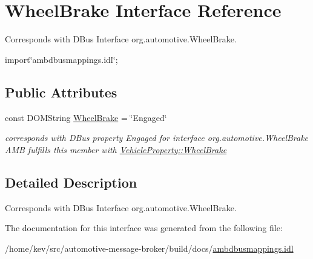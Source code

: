 \hypertarget{interfaceWheelBrake}{\section{Wheel\+Brake Interface Reference}
\label{interfaceWheelBrake}
}


Corresponds with D\+Bus Interface org.\+automotive.\+Wheel\+Brake.  




{\ttfamily import\char`\"{}ambdbusmappings.\+idl\char`\"{};}

\subsection*{Public Attributes}
\begin{DoxyCompactItemize}
\item 
\hypertarget{interfaceWheelBrake_aefe3f165494d64a9d241d239765c117b}{const D\+O\+M\+String \hyperlink{interfaceWheelBrake_aefe3f165494d64a9d241d239765c117b}{Wheel\+Brake} = \char`\"{}Engaged\char`\"{}}\label{interfaceWheelBrake_aefe3f165494d64a9d241d239765c117b}

\begin{DoxyCompactList}\small\item\em corresponds with D\+Bus property Engaged for interface org.\+automotive.\+Wheel\+Brake A\+M\+B fulfills this member with \hyperlink{classVehicleProperty_ad4f1ec038bee5ef30fbf8308aaba2794}{Vehicle\+Property\+::\+Wheel\+Brake} \end{DoxyCompactList}\end{DoxyCompactItemize}


\subsection{Detailed Description}
Corresponds with D\+Bus Interface org.\+automotive.\+Wheel\+Brake. 

The documentation for this interface was generated from the following file\+:\begin{DoxyCompactItemize}
\item 
/home/kev/src/automotive-\/message-\/broker/build/docs/\hyperlink{ambdbusmappings_8idl}{ambdbusmappings.\+idl}\end{DoxyCompactItemize}
